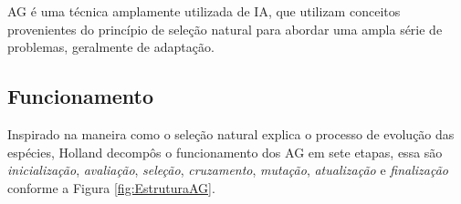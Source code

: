 AG é uma técnica amplamente utilizada de IA, que utilizam conceitos provenientes do princípio de seleção natural para abordar uma  ampla série de problemas, geralmente de adaptação.

\subsection{Funcionamento}
 
Inspirado na maneira como o seleção natural explica o processo de evolução das espécies, Holland \cite{Holland1975} decompôs o funcionamento dos AG em sete etapas, essa são \textit{inicialização}, \textit{avaliação}, \textit{seleção}, \textit{cruzamento}, \textit{mutação}, \textit{atualização} e  \textit{finalização} conforme a Figura \ref{fig:EstruturaAG}. \cite{DiogoCLucas}

\begin{minipage}{\linewidth}
	\label{fig:EstruturaAG}
\end{minipage}

